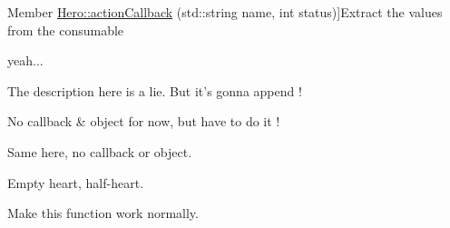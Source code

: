\begin{DoxyRefList}
Member \hyperlink{class_hero_aa41ef53abd25057ceb431811ccf80ad5}{Hero\+:\+:action\+Callback} (std\+::string name, int status)]Extract the values from the consumable  
\item[\label{todo__todo000009}%
\hypertarget{todo__todo000009}{}%
Member \hyperlink{class_hitbox_ae1b89c84071782c72ee6feb56c109c59}{Hitbox\+:\+:check\+Exists} (std\+::string)]yeah...  
\item[\label{todo__todo000011}%
\hypertarget{todo__todo000011}{}%
Member \hyperlink{class_h_u_d_window_a1c6965adb9fdd22b230d20b26fef5ac0}{H\+U\+D\+Window\+:\+:armor} (void)]The description here is a lie. But it's gonna append !  
\item[\label{todo__todo000012}%
\hypertarget{todo__todo000012}{}%
Member \hyperlink{class_h_u_d_window_acd4fdbfd1c2562384b84d3bcda80fea1}{H\+U\+D\+Window\+:\+:boots} (void)]No callback \& object for now, but have to do it !  
\item[\label{todo__todo000013}%
\hypertarget{todo__todo000013}{}%
Member \hyperlink{class_h_u_d_window_a378bc8269cacb151f68cfb37114e0c38}{H\+U\+D\+Window\+:\+:consumable} (void)]Same here, no callback or object.  
\item[\label{todo__todo000010}%
\hypertarget{todo__todo000010}{}%
Member \hyperlink{class_h_u_d_window_a8fc917fbfae792d046e90448c963100a}{H\+U\+D\+Window\+:\+:life} (int l)]Empty heart, half-\/heart.  
\item[\label{todo__todo000014}%
\hypertarget{todo__todo000014}{}%
Member \hyperlink{class_h_u_d_window_a8264836f3c55d8211f4e5166e9049628}{H\+U\+D\+Window\+:\+:minimap} (void)]Make this function work normally. 
\end{DoxyRefList}